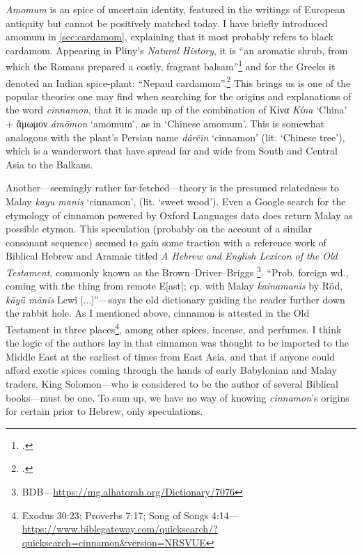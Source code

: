 
\textit{Amomum} is an spice of uncertain identity, featured in the writings of European antiquity but cannot be positively matched today. I have briefly introduced amomum in \cref{sec:cardamom}, explaining that it most probably refers to black cardamom. Appearing in Pliny's \textit{Natural History}, it is ``an aromatic shrub, from which the Romans prepared a costly, fragrant balsam''\footcite[amomum ]{lewis_latin_1879} and for the Greeks it denoted an Indian spice-plant: ``Nepaul cardamom''.\footcite[ἄμωμον ]{liddell_greek-english_1940}
This brings us is one of the popular theories one may find when searching for the origins and explanations of the word \textit{cinnamon}, that it is made up of the combination of Κίνα \textit{Kína} `China' + ἄμωμον \textit{ámōmon} `amomum', as in `Chinese amomum'. This is somewhat analogous with the plant's Persian name \textit{dârčin} `cinnamon' (lit. `Chinese tree'), which is a \gls{wanderwort} that have spread far and wide from South and Central Asia to the Balkans. 

Another---seemingly rather far-fetched---theory is the presumed relatedness to Malay \textit{kayu manis} `cinnamon', (lit. `sweet wood'). Even a Google search for the etymology of cinnamon powered by Oxford Languages data does return Malay as possible etymon. This speculation (probably on the account of a similar consonant sequence) seemed to gain some traction with a reference work of Biblical Hebrew and Aramaic titled \textit{A Hebrew and English Lexicon of the Old Testament}, commonly known as the Brown–Driver–Briggs \autocite[see][890]{brown_hebrew_1939}\footnote{BDB---\url{https://mg.alhatorah.org/Dictionary/7076}}. ``Prob. foreign wd., coming with the thing from remote E[ast]; cp. with Malay \textit{kainamanis} by Röd, \textit{kāyü mānĭs} Lewi [...]''---says the old dictionary guiding the reader further down the rabbit hole. As I mentioned above, cinnamon is attested in the Old Testament in three places\footnote{Exodus 30:23; Proverbs 7:17; Song of Songs 4:14---\url{https://www.biblegateway.com/quicksearch/?quicksearch=cinnamon&version=NRSVUE}}, among other spices, incense, and perfumes. I think the logic of the authors lay in that cinnamon was thought to be imported to the Middle East at the earliest of times from East Asia, and that if anyone could afford exotic spices coming through the hands of early Babylonian and Malay traders, King Solomon---who is considered to be the author of several Biblical books---must be one. To sum up, we have no way of knowing \textit{cinnamon}'s origins for certain prior to Hebrew, only speculations.

